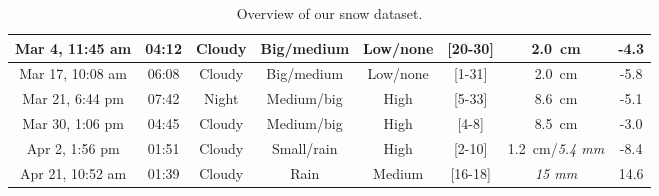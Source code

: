\begin{table}[htbp]
\begin{tabular}{|c|c|c|c|c|c|c|c|}
        Mar 4, 11:45 am    &  04:12            & Cloudy        & Big/medium          & Low/none         & [20-30]                        & \SI{2.0}{\cm}                 & -4.3  \\\hline
        Mar 17, 10:08 am   &  06:08            & Cloudy        & Big/medium          & Low/none         & [1-31]                         & \SI{2.0}{\cm}                 & -5.8  \\\hline
        Mar 21, 6:44 pm    &  07:42            & Night         & Medium/big          & High             & [5-33]                         & \SI{8.6}{\cm}                 & -5.1  \\\hline
        Mar 30, 1:06 pm    &  04:45            & Cloudy        & Medium/big          & High             & [4-8]                          & \SI{8.5}{\cm}                 & -3.0  \\\hline
        Apr 2, 1:56 pm     &  01:51            & Cloudy        & Small/rain          & High             & [2-10]                         & \SI{1.2}{\cm}/\textit{5.4 mm} & -8.4  \\\hline
        Apr 21, 10:52 am   &  01:39            & Cloudy        & Rain                & Medium           & [16-18]                        & \textit{15 mm}                & 14.6  \\\hline
    \end{tabular}
    \caption{Overview of our snow dataset.}
    \label{tab:overview-dataset}
\end{table}

